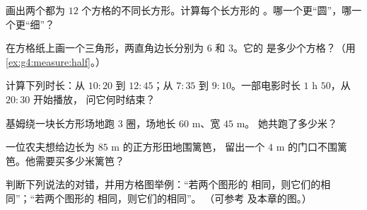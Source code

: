 \begin{exercise}[$\star$]\label{exo:g4:measure:6}
画出两个都为 $12$ 个方格的不同长方形。计算每个长方形的
。哪一个更“圆”，哪一个更“细”？
\end{exercise}

\begin{exercise}[$\star$]\label{exo:g4:measure:7}
在方格纸上画一个三角形，两直角边长分别为 $6$ 和 $3$。它的
是多少个方格？（用\cref{ex:g4:measure:half}。）
\end{exercise}

\begin{exercise}[$\star$]\label{exo:g4:measure:8}
计算下列时长：从 $10{:}20$ 到 $12{:}45$；从 $7{:}35$ 到
$9{:}10$。一部电影时长 $1$ h $50$，从 $20{:}30$ 开始播放，
问它何时结束？
\end{exercise}

\begin{exercise}[$\star$]\label{exo:g4:measure:9}
基姆绕一块长方形场地跑 $3$ 圈，场地长 $60$ m、宽 $45$ m。
她共跑了多少米？
\end{exercise}

\begin{exercise}[$\star\star$]\label{exo:g4:measure:10}
一位农夫想给边长为 $85$ m 的正方形田地围篱笆，
留出一个 $4$ m 的门口不围篱笆。他需要买多少米篱笆？
\end{exercise}

\begin{exercise}[$\star\star$]\label{exo:g4:measure:11}
判断下列说法的对错，并用方格图举例：“若两个图形的
相同，则它们的相同”；“若两个图形的
相同，则它们的相同”。
（可参考  及本章的图。）
\end{exercise}
